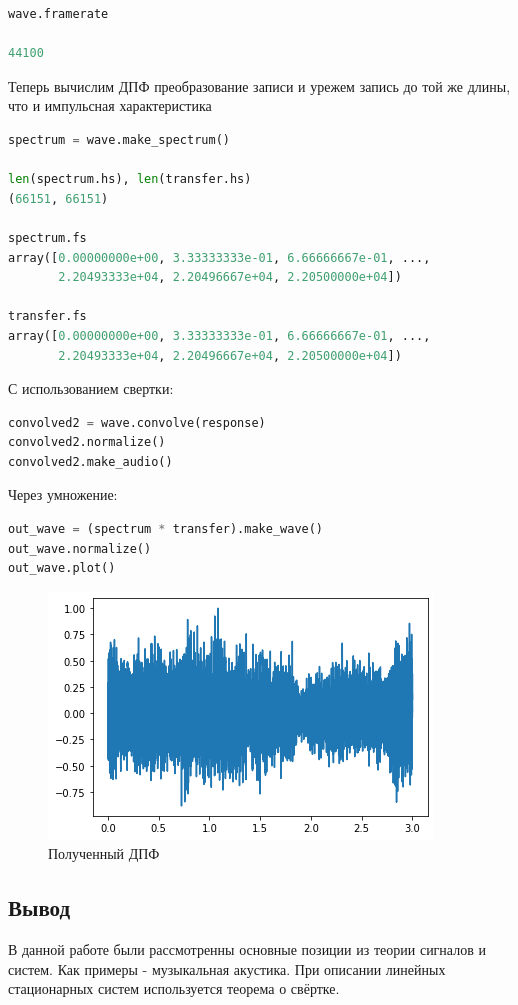 \begin{lstlisting}[language=Python]
wave.framerate

44100
\end{lstlisting}

Теперь вычислим ДПФ преобразование записи и урежем запись до той же длины, что и импульсная характеристика

\begin{lstlisting}[language=Python]
spectrum = wave.make_spectrum()

len(spectrum.hs), len(transfer.hs)
(66151, 66151)

spectrum.fs
array([0.00000000e+00, 3.33333333e-01, 6.66666667e-01, ...,
       2.20493333e+04, 2.20496667e+04, 2.20500000e+04])

transfer.fs
array([0.00000000e+00, 3.33333333e-01, 6.66666667e-01, ...,
       2.20493333e+04, 2.20496667e+04, 2.20500000e+04])
\end{lstlisting}

С использованием свертки:

\begin{lstlisting}[language=Python]
convolved2 = wave.convolve(response)
convolved2.normalize()
convolved2.make_audio()
\end{lstlisting}

Через умножение:

\begin{lstlisting}[language=Python]
out_wave = (spectrum * transfer).make_wave()
out_wave.normalize()
out_wave.plot()
\end{lstlisting}

\begin{figure}[H]
	\begin{center}
		\includegraphics[scale=1]{fig/lab10/lab10_09.png}
		\caption{Полученный ДПФ} 
	\end{center}
\end{figure}


\subsection{Вывод}

В данной работе были рассмотренны основные позиции из теории сигналов и систем. Как примеры - музыкальная акустика. При описании линейных стационарных систем используется теорема о свёртке.